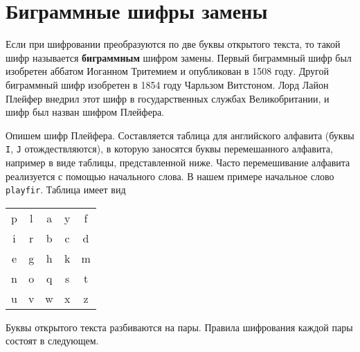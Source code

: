 \section{Биграммные шифры замены}

Если при шифровании преобразуются по две буквы открытого текста, то такой шифр называется \textbf{биграммным} шифром замены. Первый биграммный шифр был изобретен аббатом Иоганном Тритемием и опубликован в 1508 году. Другой биграммный шифр изобретен в 1854 году Чарльзом Витстоном. Лорд Лайон Плейфер внедрил этот шифр в государственных службах Великобритании, и шифр был назван шифром Плейфера.

Опишем шифр Плейфера. Составляется таблица для английского алфавита (буквы \texttt{I}, \texttt{J} отождествляются), в которую заносятся буквы перемешанного алфавита, например в виде таблицы, представленной ниже. Часто перемешивание алфавита реализуется с помощью начального слова. В нашем примере начальное слово \texttt{playfir}. Таблица имеет вид

\begin{center}
    \begin{tabular}{ccccc}
        p & l & a & y & f  \\
        i & r & b & c & d  \\
        e & g & h & k & m  \\
        n & o & q & s & t  \\
        u & v & w & x & z  \\
    \end{tabular}
\end{center}

Буквы открытого текста разбиваются на пары. Правила шифрования каждой пары состоят в следующем.

